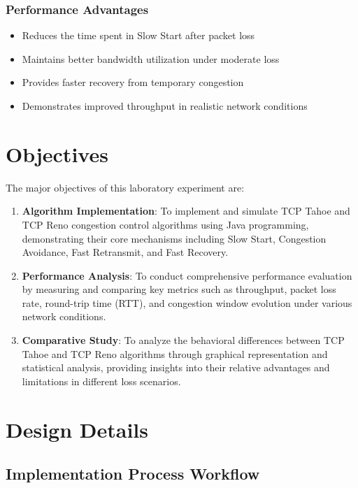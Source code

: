 \documentclass[12pt]{article}
\begin{document}
\subsubsection{Performance Advantages}
\begin{itemize}
    \item Reduces the time spent in Slow Start after packet loss
    \item Maintains better bandwidth utilization under moderate loss
    \item Provides faster recovery from temporary congestion
    \item Demonstrates improved throughput in realistic network conditions
\end{itemize}

\section{Objectives}

The major objectives of this laboratory experiment are:

\begin{enumerate}
    \item \textbf{Algorithm Implementation}: To implement and simulate TCP Tahoe and TCP Reno congestion control algorithms using Java programming, demonstrating their core mechanisms including Slow Start, Congestion Avoidance, Fast Retransmit, and Fast Recovery.
    
    \item \textbf{Performance Analysis}: To conduct comprehensive performance evaluation by measuring and comparing key metrics such as throughput, packet loss rate, round-trip time (RTT), and congestion window evolution under various network conditions.
    
    \item \textbf{Comparative Study}: To analyze the behavioral differences between TCP Tahoe and TCP Reno algorithms through graphical representation and statistical analysis, providing insights into their relative advantages and limitations in different loss scenarios.
\end{enumerate}

\section{Design Details}

\subsection{Implementation Process Workflow}
\end{document}
